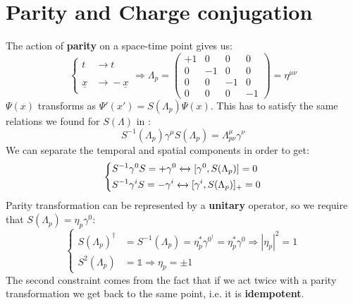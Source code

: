 \documentclass[../main.tex]{subfiles}
\begin{document}
\section{Parity and Charge conjugation}
The action of \textbf{parity} on a space-time point gives us:
\[
\left\{
\begin{aligned}
t&\xrightarrow[]{}t\\
\underline{x}&\xrightarrow[]{}-\underline{x}
\end{aligned}
\right.
\Rightarrow \Lambda_p=\left(\begin{array}{cccc}
    +1 & 0 & 0 & 0 \\
    0 & -1 & 0 & 0 \\
    0 & 0 & -1 & 0 \\
    0 & 0 & 0 & -1
\end{array}\right)=\eta^{\mu\nu}
\]
$\Psi(x)$ transforms as $\Psi'(x')=S(\Lambda_p)\Psi(x)$. This has to satisfy the same relations we found for $S(\Lambda)$ in :
\[
S^{-1}(\Lambda_p)\gamma^\mu S(\Lambda_p)=\Lambda^\mu_{p\nu}\gamma^\nu
\]
We can separate the temporal and spatial components in order to get:
\[
\left\{
\begin{aligned}
&S^{-1}\gamma^0S=+\gamma^0\xleftrightarrow[]{}[\gamma^0,S(\Lambda_p)]=0\\
&S^{-1}\gamma^i S=-\gamma^i\xleftrightarrow[]{}[\gamma^i,S(\Lambda_p)]_+=0
\end{aligned}
\right.
\]
Parity transformation can be represented by a \textbf{unitary} operator, so we require that $S(\Lambda_p)=\eta_p\gamma^0$:
\[
\left\{
\begin{aligned}
S(\Lambda_p)^\dagger&=S^{-1}(\Lambda_p)=\eta_p^*\gamma^{0^\dagger}=\eta_p^*\gamma^0\Rightarrow|\eta_p|^2=1\\
S^2(\Lambda_p)&=\mathbb{1}\Rightarrow\eta_p=\pm1
\end{aligned}
\right.
\]
The second constraint comes from the fact that if we act twice with a parity transformation we get back to the same point, i.e. it is \textbf{idempotent}.
\end{document}
